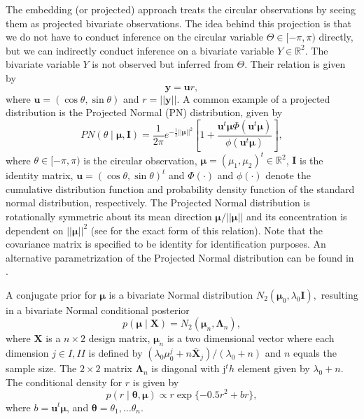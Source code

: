 The embedding (or projected) approach treats the circular observations
by seeing them as projected bivariate observations. The idea behind this
projection is that we do not have to conduct inference on the circular
variable \(\Theta \in [-\pi, \pi)\) directly, but we can indirectly
conduct inference on a bivariate variable \(Y \in \mathbb{R}^2\). The
bivariate variable \(Y\) is not observed but inferred from \(\Theta\).
Their relation is given by
\begin{equation} \boldsymbol{y} = \boldsymbol{u}r, \end{equation} where
\(\boldsymbol{u} = (\cos \theta, \sin \theta)\) and
\(r = \vert\vert \boldsymbol{y} \vert\vert\). A common example of a
projected distribution is the Projected Normal (PN) distribution, given
by \begin{equation}
PN(\theta \mid \boldsymbol{\mu}, \boldsymbol{I})  = \frac{1}{2 \pi} e^{-\frac{1}{2}\vert \vert \boldsymbol\mu \vert \vert ^ 2} \left[1+\frac{\boldsymbol{u}^t\boldsymbol\mu\Phi(\boldsymbol{u}^t\boldsymbol\mu)}{\phi(\boldsymbol{u}^t\boldsymbol\mu)}\right],
\label{eq:PNdistribution}
\end{equation} where \(\theta \in [-\pi, \pi)\) is the circular
observation,
\(\boldsymbol{\mu} = (\mu_{1}, \mu_{2})^{t} \in \mathbb{R}^2\),
\(\boldsymbol{I}\) is the identity matrix,
\(\boldsymbol{u} = (\cos \theta, \sin \theta)^{t}\) and \(\Phi(\cdot)\)
and \(\phi(\cdot)\) denote the cumulative distribution function and
probability density function of the standard normal distribution,
respectively. The Projected Normal distribution is rotationally
symmetric about its mean direction
\(\boldsymbol{\mu}/\vert\vert\boldsymbol{\mu}\vert\vert\) and its
concentration is dependent on \(\vert\vert\boldsymbol{\mu}\vert\vert^2\)
(see \citet{Kendall1974} for the exact form of this relation). Note that
the covariance matrix is specified to be identity for identification
purposes. An alternative parametrization of the Projected Normal
distribution can be found in \citet{wang2012directional}.

A conjugate prior for \(\boldsymbol{\mu}\) is a bivariate Normal
distribution \(N_2(\boldsymbol{\mu}_0, \lambda_0\boldsymbol{I}),\)
resulting in a bivariate Normal conditional posterior
\citep{Nunez-Antonio2005} \begin{equation}
p(\boldsymbol{\mu} \mid \boldsymbol{X}) = N_2(\boldsymbol{\mu}_n, \boldsymbol{\Lambda}_n),
\end{equation} where \(\boldsymbol{X}\) is a \(n\times2\) design matrix,
\(\boldsymbol{\mu}_n\) is a two dimensional vector where each dimension
\(j \in {I,II}\) is defined by
\((\lambda_0\mu_0^j + n\bar{\boldsymbol{X}}_{j})/(\lambda_0 + n)\) and
\(n\) equals the sample size. The \(2\times2\) matrix
\(\boldsymbol{\Lambda}_n\) is diagonal with j\(^th\) element given by
\(\lambda_0 + n\). The conditional density for \(r\) is given by
\begin{equation}
p(r \mid \boldsymbol{\theta}, \boldsymbol{\mu}) \propto r \exp\{-0.5r^2 + br\},
\end{equation} where \(b = \boldsymbol{u}^t\boldsymbol{\mu}\), and
\(\boldsymbol{\theta} = \theta_1, \dots \theta_n\).

